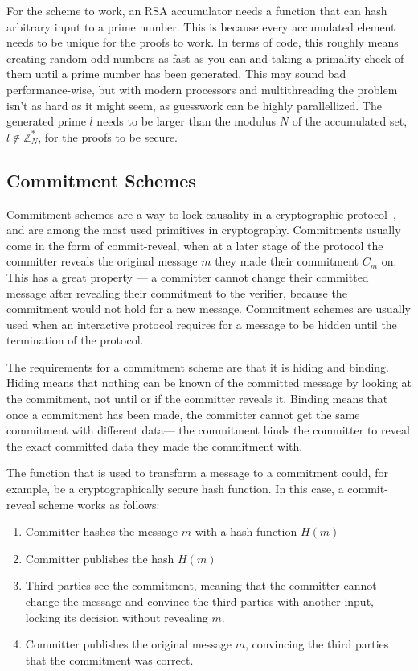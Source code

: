 For the scheme to work, an RSA accumulator needs a function that can hash arbitrary input to a prime number. This is because every accumulated element needs to be unique for the proofs to work. In terms of code, this roughly means creating random odd numbers as fast as you can and taking a primality check of them until a prime number has been generated. This may sound bad performance-wise, but with modern processors and multithreading the problem isn't as hard as it might seem, as guesswork can be highly parallellized. The generated prime \(l\) needs to be larger than the modulus \(N\) of the accumulated set, \(l \notin \mathbb{Z}^*_N\), for the proofs to be secure.

\subsection{Commitment Schemes}
Commitment schemes are a way to lock causality in a cryptographic protocol~\cite{Damgard1998-vs}, and are among the most used primitives in cryptography. Commitments usually come in the form of commit-reveal, when at a later stage of the protocol the committer reveals the original message \(m\) they made their commitment \(C_m\) on. This has a great property --- a committer cannot change their committed message after revealing their commitment to the verifier, because the commitment would not hold for a new message. Commitment schemes are usually used when an interactive protocol requires for a message to be hidden until the termination of the protocol.

The requirements for a commitment scheme are that it is hiding and binding. Hiding means that nothing can be known of the committed message by looking at the commitment, not until or if the committer reveals it. Binding means that once a commitment has been made, the committer cannot get the same commitment with different data--- the commitment binds the committer to reveal the exact committed data they made the commitment with.

The function that is used to transform a message to a commitment could, for example, be a cryptographically secure hash function. In this case, a commit-reveal scheme works as follows:

\begin{enumerate}
  \item Committer hashes the message \(m\) with a hash function \(H(m)\)
  \item Committer publishes the hash \(H(m)\)
  \item Third parties see the commitment, meaning that the committer cannot change the message and convince the third parties with another input, locking its decision without revealing \(m\).
  \item Committer publishes the original message \(m\), convincing the third parties that the commitment was correct.
\end{enumerate}

